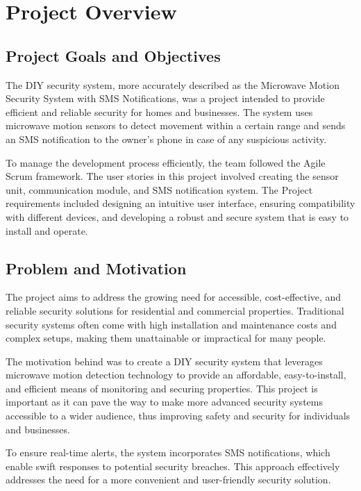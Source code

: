 \section{Project Overview}\label{sec:project-overview}

\subsection{Project Goals and Objectives}\label{subsec:project-goals-and-objectives}
The \brand{} DIY security system, more accurately described as the Microwave Motion
Security System with SMS Notifications, was a project intended to provide efficient
and reliable security for homes and businesses. The system uses microwave motion
sensors to detect movement within a certain range and sends an SMS notification to
the owner's phone in case of any suspicious activity.

To manage the development process efficiently, the team followed the Agile Scrum framework.
The user stories in this project involved creating the sensor unit, communication module,
and SMS notification system. The Project requirements included designing an intuitive
user interface, ensuring compatibility with different devices, and developing a robust and
secure system that is easy to install and operate.

\subsection{Problem and Motivation}\label{subsec:problem-and-motivation}

The \brand{} project aims to address the growing need for accessible, cost-effective,
and reliable security solutions for residential and commercial properties.
Traditional security systems often come with high installation and maintenance
costs and complex setups, making them unattainable or impractical for many people.

The motivation behind \brand{} was to create a DIY security system that leverages
microwave motion detection technology to provide an affordable, easy-to-install, and
efficient means of monitoring and securing properties. This project is important as
it can pave the way to make more advanced security systems accessible to a wider
audience, thus improving safety and security for individuals and businesses.

To ensure real-time alerts, the system incorporates SMS notifications, which enable
swift responses to potential security breaches. This approach effectively addresses
the need for a more convenient and user-friendly security solution.

